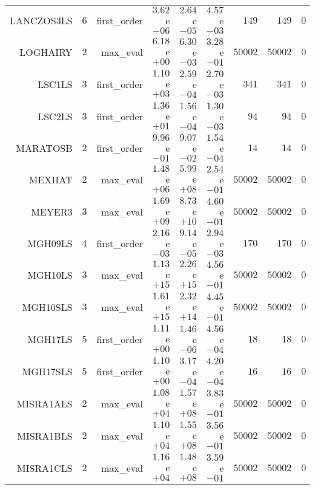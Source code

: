 \begin{longtable}{rrrrrrrrr}
LANCZOS3LS & \(     6\) & first\_order & \( 3.62\)e\(-06\) & \( 2.64\)e\(-05\) & \( 4.57\)e\(-03\) & \(   149\) & \(   149\) & \(     0\) \\
LOGHAIRY & \(     2\) & max\_eval & \( 6.18\)e\(+00\) & \( 6.30\)e\(-03\) & \( 3.28\)e\(-01\) & \( 50002\) & \( 50002\) & \(     0\) \\
LSC1LS & \(     3\) & first\_order & \( 1.10\)e\(+03\) & \( 2.59\)e\(-04\) & \( 2.70\)e\(-03\) & \(   341\) & \(   341\) & \(     0\) \\
LSC2LS & \(     3\) & first\_order & \( 1.36\)e\(+01\) & \( 1.56\)e\(-04\) & \( 1.30\)e\(-03\) & \(    94\) & \(    94\) & \(     0\) \\
MARATOSB & \(     2\) & first\_order & \( 9.96\)e\(-01\) & \( 9.07\)e\(-02\) & \( 1.54\)e\(-04\) & \(    14\) & \(    14\) & \(     0\) \\
MEXHAT & \(     2\) & max\_eval & \( 1.48\)e\(+06\) & \( 5.99\)e\(+08\) & \( 2.54\)e\(-01\) & \( 50002\) & \( 50002\) & \(     0\) \\
MEYER3 & \(     3\) & max\_eval & \( 1.69\)e\(+09\) & \( 8.73\)e\(+10\) & \( 4.60\)e\(-01\) & \( 50002\) & \( 50002\) & \(     0\) \\
MGH09LS & \(     4\) & first\_order & \( 2.16\)e\(-03\) & \( 9.14\)e\(-05\) & \( 2.94\)e\(-03\) & \(   170\) & \(   170\) & \(     0\) \\
MGH10LS & \(     3\) & max\_eval & \( 1.13\)e\(+15\) & \( 2.26\)e\(+15\) & \( 4.56\)e\(-01\) & \( 50002\) & \( 50002\) & \(     0\) \\
MGH10SLS & \(     3\) & max\_eval & \( 1.61\)e\(+15\) & \( 2.32\)e\(+14\) & \( 4.45\)e\(-01\) & \( 50002\) & \( 50002\) & \(     0\) \\
MGH17LS & \(     5\) & first\_order & \( 1.11\)e\(+00\) & \( 1.46\)e\(-06\) & \( 4.56\)e\(-04\) & \(    18\) & \(    18\) & \(     0\) \\
MGH17SLS & \(     5\) & first\_order & \( 1.10\)e\(+00\) & \( 3.17\)e\(-04\) & \( 4.20\)e\(-04\) & \(    16\) & \(    16\) & \(     0\) \\
MISRA1ALS & \(     2\) & max\_eval & \( 1.08\)e\(+04\) & \( 1.57\)e\(+08\) & \( 3.83\)e\(-01\) & \( 50002\) & \( 50002\) & \(     0\) \\
MISRA1BLS & \(     2\) & max\_eval & \( 1.10\)e\(+04\) & \( 1.55\)e\(+08\) & \( 3.56\)e\(-01\) & \( 50002\) & \( 50002\) & \(     0\) \\
MISRA1CLS & \(     2\) & max\_eval & \( 1.16\)e\(+04\) & \( 1.48\)e\(+08\) & \( 3.59\)e\(-01\) & \( 50002\) & \( 50002\) & \(     0\) \\

\end{longtable}
